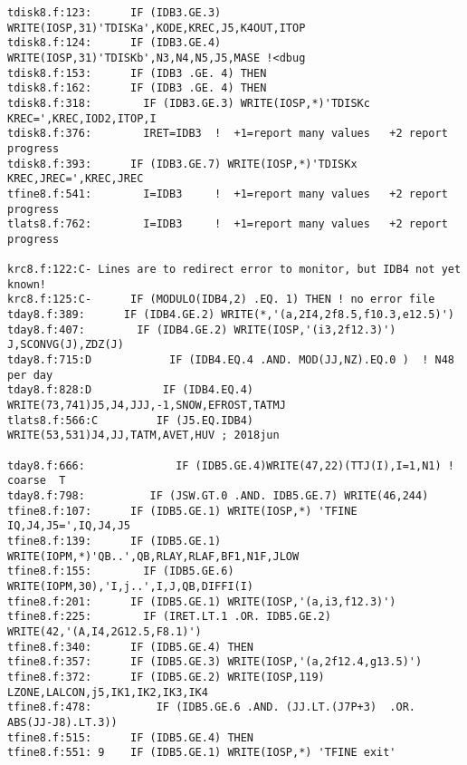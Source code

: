 \documentclass{article}
\begin{document}
\begin{verbatim}
tdisk8.f:123:      IF (IDB3.GE.3) WRITE(IOSP,31)'TDISKa',KODE,KREC,J5,K4OUT,ITOP
tdisk8.f:124:      IF (IDB3.GE.4) WRITE(IOSP,31)'TDISKb',N3,N4,N5,J5,MASE !<dbug
tdisk8.f:153:      IF (IDB3 .GE. 4) THEN
tdisk8.f:162:      IF (IDB3 .GE. 4) THEN
tdisk8.f:318:        IF (IDB3.GE.3) WRITE(IOSP,*)'TDISKc KREC=',KREC,IOD2,ITOP,I
tdisk8.f:376:        IRET=IDB3  !  +1=report many values   +2 report progress 
tdisk8.f:393:      IF (IDB3.GE.7) WRITE(IOSP,*)'TDISKx  KREC,JREC=',KREC,JREC
tfine8.f:541:        I=IDB3     !  +1=report many values   +2 report progress 
tlats8.f:762:        I=IDB3     !  +1=report many values   +2 report progress 

krc8.f:122:C- Lines are to redirect error to monitor, but IDB4 not yet known!
krc8.f:125:C-      IF (MODULO(IDB4,2) .EQ. 1) THEN ! no error file 
tday8.f:389:      IF (IDB4.GE.2) WRITE(*,'(a,2I4,2f8.5,f10.3,e12.5)') 
tday8.f:407:        IF (IDB4.GE.2) WRITE(IOSP,'(i3,2f12.3)') J,SCONVG(J),ZDZ(J)
tday8.f:715:D            IF (IDB4.EQ.4 .AND. MOD(JJ,NZ).EQ.0 )  ! N48 per day
tday8.f:828:D           IF (IDB4.EQ.4) WRITE(73,741)J5,J4,JJJ,-1,SNOW,EFROST,TATMJ
tlats8.f:566:C         IF (J5.EQ.IDB4) WRITE(53,531)J4,JJ,TATM,AVET,HUV ; 2018jun

tday8.f:666:              IF (IDB5.GE.4)WRITE(47,22)(TTJ(I),I=1,N1) ! coarse  T
tday8.f:798:          IF (JSW.GT.0 .AND. IDB5.GE.7) WRITE(46,244) 
tfine8.f:107:      IF (IDB5.GE.1) WRITE(IOSP,*) 'TFINE IQ,J4,J5=',IQ,J4,J5
tfine8.f:139:      IF (IDB5.GE.1) WRITE(IOPM,*)'QB..',QB,RLAY,RLAF,BF1,N1F,JLOW
tfine8.f:155:        IF (IDB5.GE.6) WRITE(IOPM,30),'I,j..',I,J,QB,DIFFI(I)
tfine8.f:201:      IF (IDB5.GE.1) WRITE(IOSP,'(a,i3,f12.3)') 
tfine8.f:225:        IF (IRET.LT.1 .OR. IDB5.GE.2) WRITE(42,'(A,I4,2G12.5,F8.1)')
tfine8.f:340:      IF (IDB5.GE.4) THEN
tfine8.f:357:      IF (IDB5.GE.3) WRITE(IOSP,'(a,2f12.4,g13.5)') 
tfine8.f:372:      IF (IDB5.GE.2) WRITE(IOSP,119) LZONE,LALCON,j5,IK1,IK2,IK3,IK4
tfine8.f:478:          IF (IDB5.GE.6 .AND. (JJ.LT.(J7P+3)  .OR. ABS(JJ-J8).LT.3))
tfine8.f:515:      IF (IDB5.GE.4) THEN
tfine8.f:551: 9    IF (IDB5.GE.1) WRITE(IOSP,*) 'TFINE exit'


\end{verbatim}
\end{document}

